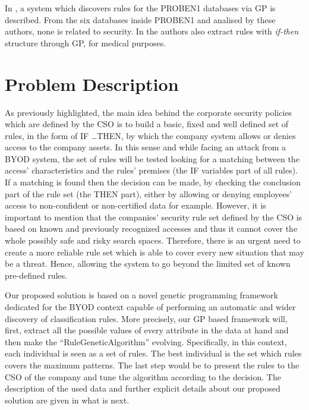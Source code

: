 \documentclass[runningheads,a4paper]{llncs}
\begin{document}

In \cite{DeFalco2002257}, a system which discovers rules for the PROBEN1 databases via GP is described. From the six databases inside PROBEN1 and analised by these authors, none is related to security.
In \cite{Tsakonas2004195} the authors also extract rules with \textit{if-then} structure through GP, for medical purposes.

\section{Problem Description}
\label{sec:problem}

As previously highlighted, the main idea behind the corporate security policies which are defined by the CSO is to build a basic, fixed and well defined set of rules, in the form of IF \ldots THEN,  by which the company system allows or denies access to the company assets. In this sense and while facing an attack from a BYOD system, the set of rules will be tested looking for a matching between the access' characteristics and the rules' premises (the IF variables part of all rules). If a matching is found then the decision can be made, by checking the conclusion part of the rule set (the THEN part), either by allowing or denying employees' access to non-confident or non-certified data for example. However, it is important to mention that the companies' security rule set defined by the CSO is based on known and previously recognized accesses and thus it cannot cover the whole possibly safe and risky search spaces. Therefore, there is an urgent need to create a more reliable rule set which is able to cover every new situation that may be a threat. Hence, allowing the system to go beyond the limited set of known pre-defined rules.

Our proposed solution is based on a novel genetic programming framework dedicated for the BYOD context capable of performing an automatic and wider discovery of classification rules. More precisely, our GP based framework will, first, extract all the possible values of every attribute in the data at hand and then make the ``RuleGeneticAlgorithm'' evolving. Specifically, in this context, each individual is seen as a set of rules. The best individual is the set which rules covers the maximum patterns. The last step would be to present the rules to the CSO of the company and tune the algorithm according to the decision. The description of the used data and further explicit details about our proposed solution are given in what is next.
\end{document}
